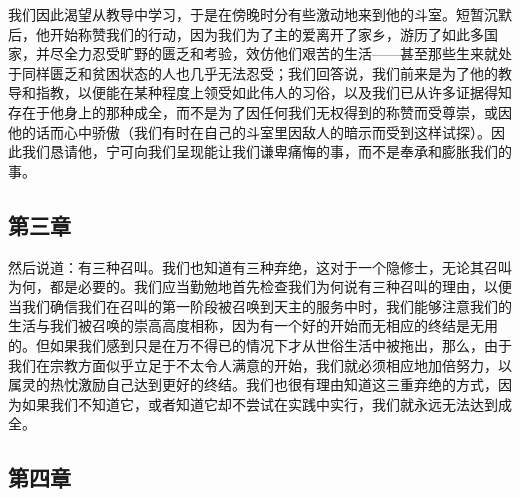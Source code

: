 \par

我们因此渴望从教导中学习，于是在傍晚时分有些激动地来到他的斗室。短暂沉默后，他开始称赞我们的行动，因为我们为了主的爱离开了家乡，游历了如此多国家，并尽全力忍受旷野的匮乏和考验，效仿他们艰苦的生活——甚至那些生来就处于同样匮乏和贫困状态的人也几乎无法忍受；我们回答说，我们前来是为了他的教导和指教，以便能在某种程度上领受如此伟人的习俗，以及我们已从许多证据得知存在于他身上的那种成全，而不是为了因任何我们无权得到的称赞而受尊崇，或因他的话而心中骄傲（我们有时在自己的斗室里因敌人的暗示而受到这样试探）。因此我们恳请他，宁可向我们呈现能让我们谦卑痛悔的事，而不是奉承和膨胀我们的事。\par


\subsection{第三章}

\par

然后说道：有三种召叫。我们也知道有三种弃绝，这对于一个隐修士，无论其召叫为何，都是必要的。我们应当勤勉地首先检查我们为何说有三种召叫的理由，以便当我们确信我们在召叫的第一阶段被召唤到天主的服务中时，我们能够注意我们的生活与我们被召唤的崇高高度相称，因为有一个好的开始而无相应的终结是无用的。但如果我们感到只是在万不得已的情况下才从世俗生活中被拖出，那么，由于我们在宗教方面似乎立足于不太令人满意的开始，我们就必须相应地加倍努力，以属灵的热忱激励自己达到更好的终结。我们也很有理由知道这三重弃绝的方式，因为如果我们不知道它，或者知道它却不尝试在实践中实行，我们就永远无法达到成全。\par


\subsection{第四章}

\par

